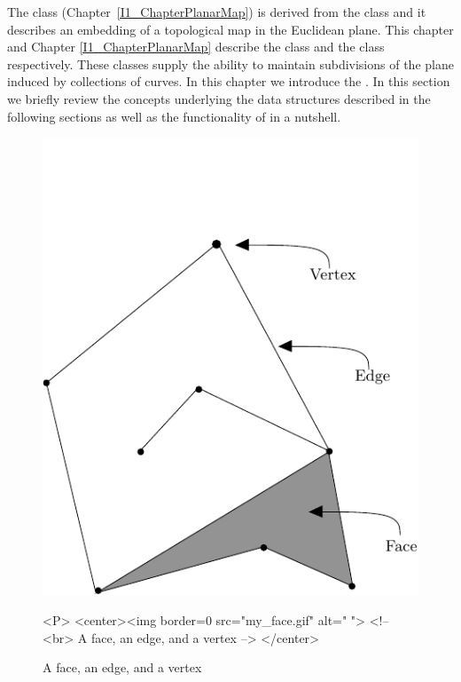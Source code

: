    The  class
   (Chapter~\ref{I1_ChapterPlanarMap}) is derived from the
    class and it describes an embedding of
   a topological map in the Euclidean plane.  This chapter and Chapter
   \ref{I1_ChapterPlanarMap} describe the  class
   and the  class respectively. These classes supply
   the ability to maintain subdivisions of the plane induced by
   collections of curves. In this chapter we introduce the
   . In this section we briefly review the
   concepts underlying the data structures described in the following
   sections as well as the functionality of  in a
   nutshell.

\begin{figure}
\begin{ccTexOnly}
    \centerline{
      \includegraphics{Topological_map/my_face}
    }
\end{ccTexOnly}
\caption{A face, an edge, and a vertex \label{fig:face}}

\begin{ccHtmlOnly}
  <P>
  <center><img border=0 src="my_face.gif" alt=" ">
  <!-- <br> A face, an edge, and a vertex -->
  </center>
\end{ccHtmlOnly}

\end{figure}

